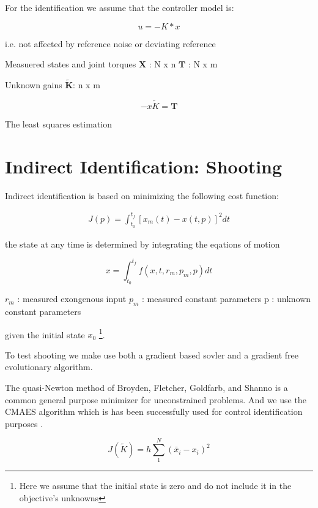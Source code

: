 \documentclass{article}
\begin{document}
For the identification we assume that the controller model is:

\begin{equation}
  u = -K * x
\end{equation}

i.e. not affected by reference noise or deviating reference

Measuered states and joint torques
$\mathbf{X}$ : N x n
$\mathbf{T}$ : N x m

Unknown gains
$\tilde{\mathbf{K}}$: n x m

\begin{equation}
  -x \tilde{K} = \mathbf{T}
\end{equation}

The least squares estimation


\section{Indirect Identification: Shooting}

Indirect identification is based on minimizing the following cost function:

\begin{align}
  J(p) = \int_{t_0}^{t_f} [x_m(t) - x(t, p)]^2 dt
\end{align}

the state at any time is determined by integrating the eqations of motion

\begin{equation}
  x = \int_{t_0}^{t_f} f(x, t, r_m, p_m, p) dt
\end{equation}

$r_m$ : measured exongenous input
$p_m$ : measured constant parameters
p : unknown constant parameters

given the initial state $x_0$ \footnote{Here we assume that the initial state is
zero and do not include it in the objective's unknowns}.

To test shooting we make use both a gradient based sovler and a gradient free
evolutionary algorithm.

The quasi-Newton method of Broyden, Fletcher, Goldfarb, and Shanno is a common
general purpose minimizer for unconstrained problems. And we use the CMAES
algorithm which is has been successfully used for control identification
purposes \cite{Wang2010}.

\begin{equation}
  J(\tilde{K}) = h \sum_1^N (\bar{x}_i - x_i)^2
\end{equation}
\end{document}
